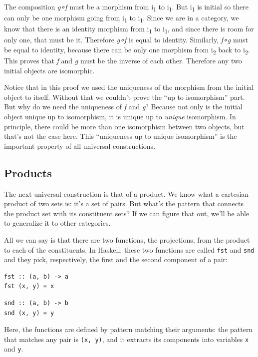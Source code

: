 The composition \emph{g∘f} must be a morphism from i\textsubscript{1} to
i\textsubscript{1}. But i\textsubscript{1} is initial so there can only
be one morphism going from i\textsubscript{1} to i\textsubscript{1}.
Since we are in a category, we know that there is an identity morphism
from i\textsubscript{1} to i\textsubscript{1}, and since there is room
for only one, that must be it. Therefore \emph{g∘f} is equal to
identity. Similarly, \emph{f∘g} must be equal to identity, because there
can be only one morphism from i\textsubscript{2} back to
i\textsubscript{2}. This proves that \emph{f} and \emph{g} must be the
inverse of each other. Therefore any two initial objects are isomorphic.

Notice that in this proof we used the uniqueness of the morphism from
the initial object to itself. Without that we couldn't prove the ``up to
isomorphism'' part. But why do we need the uniqueness of \emph{f} and
\emph{g}? Because not only is the initial object unique up to
isomorphism, it is unique up to \emph{unique} isomorphism. In principle,
there could be more than one isomorphism between two objects, but that's
not the case here. This ``uniqueness up to unique isomorphism'' is the
important property of all universal constructions.

\subsection{Products}\label{products}

The next universal construction is that of a product. We know what a
cartesian product of two sets is: it's a set of pairs. But what's the
pattern that connects the product set with its constituent sets? If we
can figure that out, we'll be able to generalize it to other categories.

All we can say is that there are two functions, the projections, from
the product to each of the constituents. In Haskell, these two functions
are called \texttt{fst} and \texttt{snd} and they pick, respectively,
the first and the second component of a pair:

\begin{verbatim}
fst :: (a, b) -> a
fst (x, y) = x
\end{verbatim}

\begin{verbatim}
snd :: (a, b) -> b
snd (x, y) = y
\end{verbatim}

Here, the functions are defined by pattern matching their arguments: the
pattern that matches any pair is \texttt{(x, y)}, and it extracts its
components into variables \texttt{x} and \texttt{y}.

